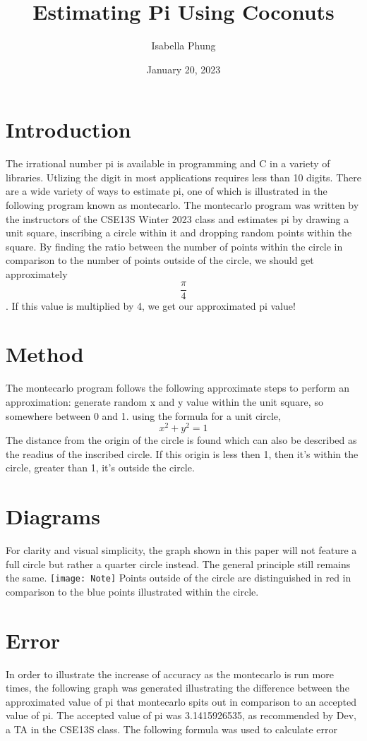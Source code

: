 \documentclass{article}
\title{Estimating Pi Using Coconuts}
\author{Isabella Phung}
\date{January 20, 2023}
\begin{document}
\maketitle

\section{Introduction}

The irrational number pi is available in programming and C in a variety of libraries. Utlizing the digit in most applications requires less than 10 digits. There are a wide variety of ways to estimate pi, one of which is illustrated in the following program known as monte\textunderscore carlo.
The monte\textunderscore carlo program was written by the instructors of the CSE13S Winter 2023 class and estimates pi by drawing a unit square, inscribing a circle within it and dropping random points within the square. By finding the ratio between the number of points within the circle in comparison to the number of points outside of the circle, we should get approximately $$\frac{\pi}{4}$$. If this value is multiplied by 4, we get our approximated pi value!

\section{Method}
The monte\textunderscore carlo program follows the following approximate steps to perform an approximation:
generate random x and y value within the unit square, so somewhere between 0 and 1.
using the formula for a unit circle,
$$x^2 + y^2 = 1$$
The distance from the origin of the circle is found which can also be described as the readius of the inscribed circle.
If this origin is less then 1, then it's within the circle, greater than 1, it's outside the circle.

\section{Diagrams}
For clarity and visual simplicity, the graph shown in this paper will not feature a full circle but rather a quarter circle instead. The general principle still remains the same.
\texttt{[image: Note]}
Points outside of the circle are distinguished in red in comparison to the blue points illustrated within the circle.

\section{Error}
In order to illustrate the increase of accuracy as the monte\textunderscore carlo is run more times, the following graph was generated illustrating the difference between the approximated value of pi that monte\textunderscore carlo spits out in comparison to an accepted value of pi.
The accepted value of pi was 3.1415926535, as recommended by Dev, a TA in the CSE13S class.
The following formula was used to calculate error
\end{document}
